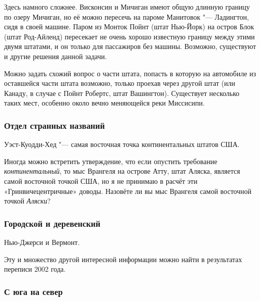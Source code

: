\documentclass[twoside]{book}
\begin{document}
Здесь намного сложнее.
Висконсин и Мичиган имеют общую длинную границу по озеру Мичиган, но её можно пересечь на пароме Манитовок "--- Ладингтон, сидя в своей машине.
Паром из Монток Пойнт %
(штат Нью-Йорк) на остров Блок %
(штат Род-Айленд) пересекает не очень хорошо известную границу между
этими двумя штатами, и он только для пассажиров без машины.
Возможно, существуют и другие решения данной задачи.\heart

Можно задать схожий вопрос о части штата, попасть в которую на автомобиле из оставшейся части штата возможно, только проехав через другой штат (или Канаду, в случае с 
Пойнт Робертс, штат Вашингтон). %
Существует несколько таких мест, особенно около вечно меняющейся реки Миссисипи.%

\subsubsection*{Отдел странных названий}%

Уэст-Куодди-Хед %
"--- самая восточная точка континентальных штатов США.\heart

\medskip

Иногда можно встретить утверждение, что если опустить требование \emph{континентальный}, то мыс Врангеля %
на острове Атту, %
штат Аляска, является самой восточной точкой США, но я не принимаю в расчёт эти «Гринвичецентричные» доводы.
Назовёте ли вы мыс Врангеля самой восточной точкой \emph{Аляски}?

\subsubsection*{Городской и деревенский}%

Нью-Джерси и Вермонт.

Эту и множество другой интересной информации можно найти в результатах
переписи 2002 года. 
\heart                          

\subsubsection*{С юга на север}%
\end{document}
